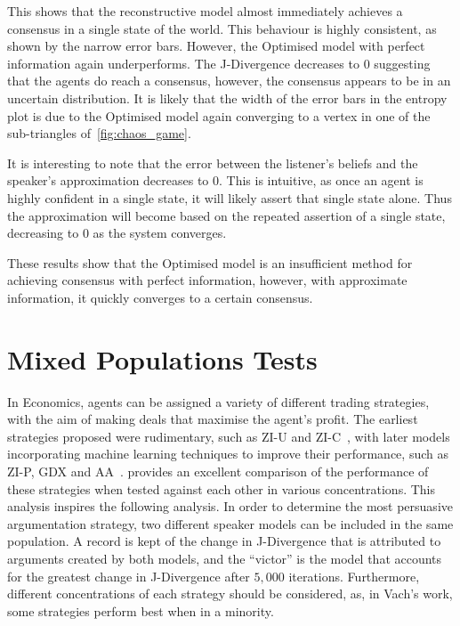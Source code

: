 This shows that the reconstructive model almost immediately achieves a consensus in a single state of the world. This behaviour is highly consistent, as shown by the narrow error bars. However, the Optimised model with perfect information again underperforms. The J-Divergence decreases to $0$ suggesting that the agents do reach a consensus, however, the consensus appears to be in an uncertain distribution. It is likely that the width of the error bars in the entropy plot is due to the Optimised model again converging to a vertex in one of the sub-triangles of~\cref{fig:chaos_game}. 

It is interesting to note that the error between the listener's beliefs and the speaker's approximation decreases to $0$. This is intuitive, as once an agent is highly confident in a single state, it will likely assert that single state alone. Thus the approximation will become based on the repeated assertion of a single state, decreasing to $0$ as the system converges. 

These results show that the Optimised model is an insufficient method for achieving consensus with perfect information, however, with approximate information, it quickly converges to a certain consensus. 



\section{Mixed Populations Tests} \label{sect:pop_tests}

In Economics, agents can be assigned a variety of different trading strategies, with the aim of making deals that maximise the agent's profit. The earliest strategies proposed were rudimentary, such as ZI-U and ZI-C~\cite{Gode1993AllocativeRationality}, with later models incorporating machine learning techniques to improve their performance, such as ZI-P, GDX and AA~\cite{Cliff1997Minimal-IntelligenceEnvironments, Gjerstad1998PriceAuctions, Vytelingum2006TheAuction}. \cite{Vach2015ComparisonAgents} provides an excellent comparison of the performance of these strategies when tested against each other in various concentrations. This analysis inspires the following analysis. In order to determine the most persuasive argumentation strategy, two different speaker models can be included in the same population. A record is kept of the change in J-Divergence that is attributed to arguments created by both models, and the ``victor'' is the model that accounts for the greatest change in J-Divergence after $5,000$ iterations. Furthermore, different concentrations of each strategy should be considered, as, in Vach's work, some strategies perform best when in a minority. 

